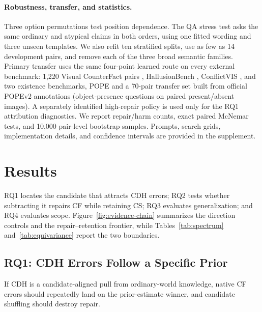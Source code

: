 \documentclass[letterpaper]{article}
\begin{document}
\paragraph{Robustness, transfer, and statistics.}
Three option permutations test position dependence. The QA stress test asks
the same ordinary and atypical claims in both orders, using one fitted wording
and three unseen templates. We also refit ten stratified splits, use as few as
14 development pairs, and remove each of the three broad semantic families.
Primary transfer uses the same four-point learned route on every external
benchmark: 1,220 Visual
CounterFact pairs \cite{golovanevsky2025pixels}, HallusionBench
\cite{guan2024hallusionbench}, ConflictVIS \cite{liu2025insight}, and two
existence benchmarks, POPE \cite{li2023pope} and a 70-pair transfer set built
from official POPEv2 annotations (object-presence questions on paired
present/absent images).
A separately identified high-repair policy is used only for the RQ1 attribution
diagnostics. We
report repair/harm counts, exact paired McNemar tests, and 10,000 pair-level
bootstrap samples. Prompts, search grids, implementation details, and confidence
intervals are provided in the supplement.

\section{Results}

RQ1 locates the candidate that attracts CDH errors; RQ2 tests whether
subtracting it repairs CF while retaining CS; RQ3 evaluates generalization;
and RQ4 evaluates scope. Figure~\ref{fig:evidence-chain}
summarizes the direction controls and the repair--retention frontier, while
Tables~\ref{tab:spectrum} and~\ref{tab:equivariance}
report the two boundaries.

\subsection{RQ1: CDH Errors Follow a Specific Prior}

If CDH is a candidate-aligned pull from ordinary-world knowledge, native CF
errors should repeatedly land on the prior-estimate winner, and candidate
shuffling should destroy repair.
\end{document}
